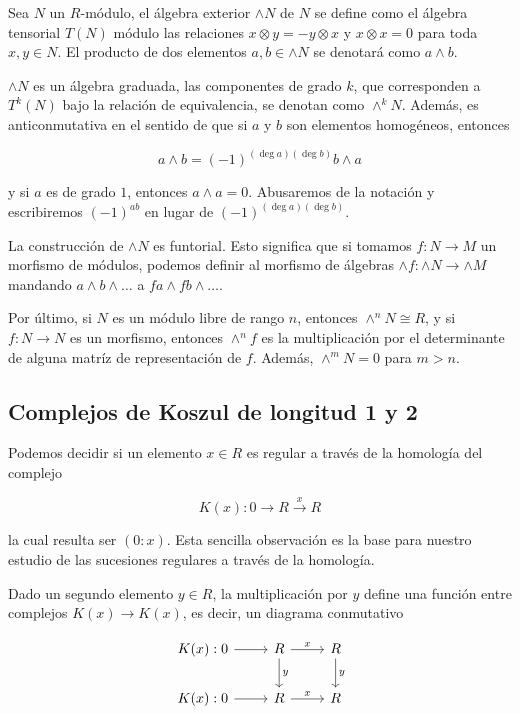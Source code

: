 \begin{definition}
Sea $N$ un $R$-módulo, el álgebra exterior $\wedge N$ de $N$ se define como el álgebra tensorial $T(N)$ módulo las relaciones $x \otimes y = -y \otimes x$ y $ x \otimes x = 0$ para toda $x, y \in N$. El producto de dos elementos $a, b \in \wedge N$ se denotará como $a \wedge b$.
\end{definition}

$\wedge N$ es un álgebra graduada, las componentes de grado $k$, que corresponden a $T^k(N)$ bajo la relación de equivalencia, se denotan como $\wedge^kN$. Además, es anticonmutativa en el sentido de que si $a$ y $b$ son elementos homogéneos, entonces

$$a \wedge b = (-1)^{(\deg a)(\deg b)} b\wedge a$$

y si $a$ es de grado $1$, entonces $a \wedge a = 0$. Abusaremos de la notación y escribiremos $(-1)^{ab}$ en lugar de $(-1)^{(\deg a)(\deg b)}$.

La construcción de $\wedge N$ es funtorial. Esto significa que si tomamos $f: N \rightarrow M$ un morfismo de módulos, podemos definir al morfismo de álgebras $\wedge f: \wedge N \rightarrow \wedge M$ mandando $a \wedge b \wedge \dots$ a $fa \wedge fb \wedge \dots$.

Por último, si $N$ es un módulo libre de rango $n$, entonces $\wedge^n N \cong R$, y si $f: N \rightarrow N$ es un morfismo, entonces $\wedge^nf$ es la multiplicación por el determinante de alguna matríz de representación de $f$. Además, $\wedge^mN = 0$ para $m > n$.

\subsection{Complejos de Koszul de longitud 1 y 2}

Podemos decidir si un elemento $x \in R$ es regular a través de la homología del complejo

$$ K(x):0\rightarrow R\xrightarrow{x} R $$

la cual resulta ser $(0:x)$. Esta sencilla observación es la base para nuestro estudio de las sucesiones regulares a través de la homología.

Dado un segundo elemento $y \in R$, la multiplicación por $y$ define una función entre complejos $K(x)\rightarrow K(x)$, es decir, un diagrama conmutativo

\[
\begin{tikzcd}
K(x):0 \arrow[r,""] & R \arrow[r,"x"] \arrow[d,"y"] & R \arrow[d,"y"]\\
K(x):0 \arrow[r,""] & R \arrow[r,"x"] & R
\end{tikzcd}
\]

